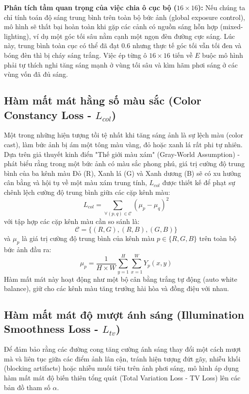 \documentclass[a4paper]{article}
\begin{document}
\noindent \textbf{Phân tích tầm quan trọng của việc chia ô cục bộ ($16 \times 16$):} Nếu chúng ta chỉ tính toán độ sáng trung bình trên toàn bộ bức ảnh (global exposure control), mô hình sẽ thất bại hoàn toàn khi gặp các cảnh có nguồn sáng hỗn hợp (mixed-lighting), ví dụ một góc tối sâu nằm cạnh một ngọn đèn đường cực sáng. Lúc này, trung bình toàn cục có thể đã đạt $0.6$ nhưng thực tế góc tối vẫn tối đen và bóng đèn thì bị cháy sáng trắng. Việc ép từng ô $16 \times 16$ tiến về $E$ buộc mô hình phải tự thích nghi tăng sáng mạnh ở vùng tối sâu và kìm hãm phơi sáng ở các vùng vốn đã đủ sáng.

\subsection{Hàm mất mát hằng số màu sắc (Color Constancy Loss - $L_{col}$)}
Một trong những hiện tượng tồi tệ nhất khi tăng sáng ảnh là sự lệch màu (color cast), làm bức ảnh bị ám một tông màu vàng, đỏ hoặc xanh lá rất phi tự nhiên. Dựa trên giả thuyết kinh điển "Thế giới màu xám" (Gray-World Assumption) - phát biểu rằng trong một bức ảnh có màu sắc phong phú, giá trị cường độ trung bình của ba kênh màu Đỏ (R), Xanh lá (G) và Xanh dương (B) sẽ có xu hướng cân bằng và hội tụ về một màu xám trung tính, $L_{col}$ được thiết kế để phạt sự chênh lệch cường độ trung bình giữa các cặp kênh màu:
\begin{equation}
    L_{col} = \sum_{\forall (p, q) \in \mathcal{C}} (\mu_p - \mu_q)^2
\end{equation}
với tập hợp các cặp kênh màu cần so sánh là:
\begin{equation}
    \mathcal{C} = \{ (R, G), (R, B), (G, B) \}
\end{equation}
và $\mu_p$ là giá trị cường độ trung bình của kênh màu $p \in \{R, G, B\}$ trên toàn bộ bức ảnh đầu ra:
\begin{equation}
    \mu_p = \frac{1}{H \times W} \sum_{y=1}^{H} \sum_{x=1}^{W} Y_p(x, y)
\end{equation}
Hàm mất mát này hoạt động như một bộ cân bằng trắng tự động (auto white balance), giữ cho các kênh màu tăng trưởng hài hòa và đồng điệu với nhau.

\subsection{Hàm mất mát độ mượt ánh sáng (Illumination Smoothness Loss - $L_{tv}$)}
Để đảm bảo rằng các đường cong tăng cường ánh sáng thay đổi một cách mượt mà và liên tục giữa các điểm ảnh lân cận, tránh hiện tượng đứt gãy, nhiễu khối (blocking artifacts) hoặc nhiễu muối tiêu trên ảnh phơi sáng, mô hình áp dụng hàm mất mát độ biến thiên tổng quát (Total Variation Loss - TV Loss) lên các bản đồ tham số $\alpha$.
\end{document}
